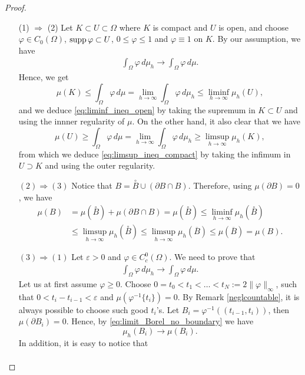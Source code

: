 \begin{proof}
\begin{enumerate}[(1)]
\item[(1) $\Rightarrow$ (2)] Let $K\subset U \subset \Omega$ where $K$ is compact and $U$ is open, and
choose $\varphi \in C_0(\Omega)$, $\operatorname{supp} \varphi \subset U$, $0 \leq \varphi
\leq 1$ and $\varphi \equiv 1$ on $K$. By our assumption, we have
\[
\begin{aligned}
\int_\Omega \varphi \, d\mu_h \to \int_\Omega \varphi \, d\mu.
\end{aligned}
\]
Hence, we get
\[
\mu(K) \leq \int_\Omega \varphi \, d\mu = \lim_{h\to \infty} \int_\Omega \varphi
\, d\mu_h \leq \liminf_{h\to \infty} \mu_h(U),
\]
and we deduce \eqref{eq:liminf_ineq_open} by taking the supremum in $K \subset U$ and using the innner regularity of $\mu$. On the other hand, it also clear that we have
\[
\mu(U) \geq \int_\Omega \varphi \, d\mu = \lim_{h\to \infty} \int_\Omega \varphi \, d\mu_h \geq \limsup_{h \to \infty} \mu_h(K),
\]
from which we deduce \eqref{eq:limsup_ineq_compact} by taking the infimum in $U \supset K$ and using the outer regularity.
\item[$(2) \Rightarrow (3)$]  Notice that $B = \overset{\circ}{B} \cup (\partial B \cap B)$. Therefore, using $\mu(\partial B) = 0$, we have
\[
\begin{aligned}
\mu(B) &= \mu(\overset{\circ}{B}) + \mu(\partial B \cap B) =
\mu(\overset{\circ}{B}) \leq \liminf_{h\to\infty} \mu_h(\overset{\circ}{B}) 
\\ &\leq \limsup_{h\to\infty} \mu_h(\overset{\circ}{B})
\leq \limsup_{h\to\infty} \mu_h(\overline{B}) \leq \mu(\overline{B}) = \mu(B).
\end{aligned}
\]
\item[$(3) \Rightarrow (1)$] Let $\varepsilon >0$ and $\varphi \in
C^0_c(\Omega)$. We need to prove that 
\[
\begin{aligned}
\int_\Omega \varphi \, d\mu_h \to \int_\Omega \varphi \, d\mu.
\end{aligned}
\]
Let us at first assume $\varphi \ge 0$. 
Choose $0 = t_0 < t_1 < \dots < t_N := 2\|\varphi\|_\infty$, such that 
$0 < t_i - t_{i-1} < \varepsilon$ and $\mu(\varphi^{-1}\{t_i\}) = 0$. By Remark \ref{neglcountable}, it is always possible to choose such good $t_{i}$'s.
Let $B_i = \varphi^{-1}((t_{i-1},t_i))$, then $\mu(\partial B_i) = 0$. Hence, by \eqref{eq:limit_Borel_no_boundary} we have
\[
\mu_h(B_i) \to \mu(B_i).
\]
In addition, it is easy to notice that
\begin{align*}

\end{align*}
\end{enumerate}
\end{proof}
